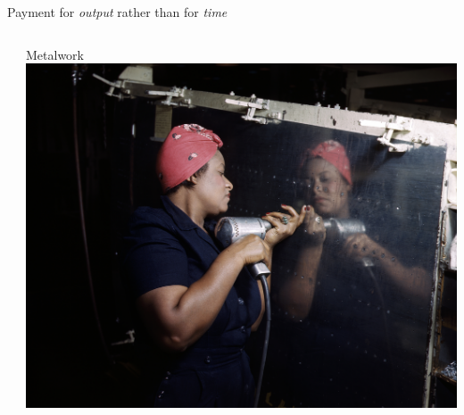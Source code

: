 \documentclass[presentation]{subfiles}
\begin{document}
\begin{frame}[t]{Payment for \emph{output} rather than for \emph{time}}
\begin{columns}[T]
\begin{column}{0.33\textwidth}
    \end{column}
    \begin{column}{0.33\textwidth}
      \centering
      Metalwork\\
      \includegraphics[max width=\linewidth,max height=.3\textheight,keepaspectratio]{figures/photo/Rosie_the_Riveter_(Vultee)_DS.jpg}
    \end{column}
  \end{columns}
  \vspace*{7mm}
  

\end{frame}
\end{document}
